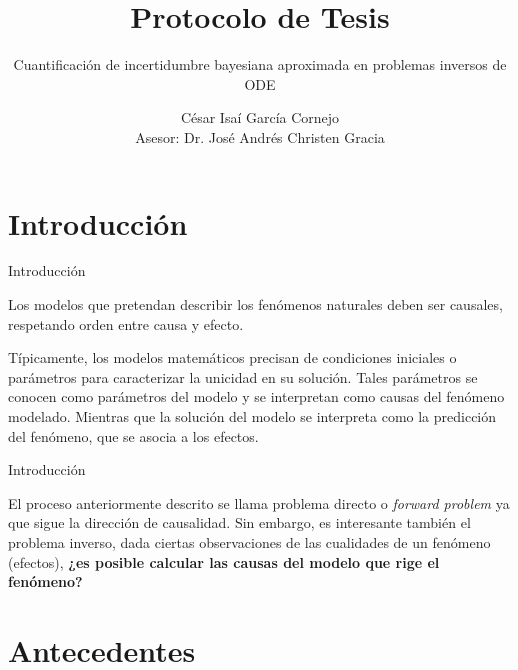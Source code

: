 \documentclass[10pt,aspectratio=169]{beamer}
\title{Protocolo de Tesis}
\subtitle{Cuantificación de incertidumbre bayesiana aproximada en problemas inversos de ODE}
\date{}
\author{César Isaí García Cornejo\\
Asesor: Dr. José Andrés Christen Gracia}
\institute{CIMAT}
\begin{document}
\maketitle


\section[Introducción]{Introducción}

\begin{frame}[fragile]{Introducción}
  
  Los modelos que pretendan describir los fenómenos naturales deben ser causales, respetando orden entre causa y efecto.

  Típicamente, los modelos matemáticos precisan de condiciones iniciales o parámetros  para caracterizar la unicidad en su solución. Tales parámetros se conocen como parámetros del modelo y se interpretan como causas del fenómeno modelado. Mientras que la solución del modelo se interpreta como la predicción del fenómeno, que se asocia a los efectos.
  
\end{frame}


\begin{frame}[fragile]{Introducción}
  
  El proceso anteriormente descrito se llama problema directo o \textit{forward problem} ya que sigue la dirección de causalidad. Sin embargo, es interesante también el problema inverso, dada ciertas observaciones de las cualidades de un fenómeno (efectos), \textbf{¿es posible calcular las causas del modelo que rige el fenómeno?}


\end{frame}

\section{Antecedentes}
\end{document}
